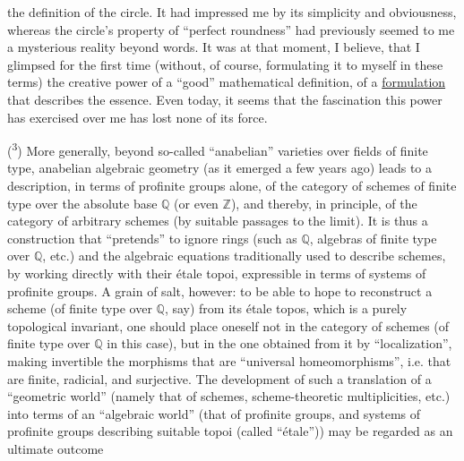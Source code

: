
the definition of the circle. It had impressed me by its
simplicity and obviousness, whereas the circle's property of ``perfect
roundness'' had previously seemed to me a mysterious reality
beyond words. It was at that moment, I believe, that I
glimpsed for the first time (without, of course, formulating it to myself
in these terms) the creative power of a ``good'' mathematical
definition, of a \uline{formulation} that describes the essence. Even today,
it seems that the fascination this power has exercised over
me has lost none of its force.

(\textsuperscript{3}) More generally, beyond so-called ``anabelian'' varieties
over fields of finite type, anabelian algebraic geometry
(as it emerged a few years ago) leads to a
description, in terms of profinite groups alone, of the category
of schemes of finite type over the absolute base $\mathbb{Q}$ (or
even $\mathbb{Z}$), and thereby, in principle, of the category of
arbitrary schemes (by suitable passages to the limit). It
is thus a construction that ``pretends'' to ignore rings
(such as $\mathbb{Q}$, algebras of finite type over $\mathbb{Q}$, etc.) and
the algebraic equations traditionally used to describe
schemes, by working directly with their étale topoi,
expressible in terms of systems of profinite groups. A
grain of salt, however: to be able to hope to reconstruct a
scheme (of finite type over $\mathbb{Q}$, say) from its étale topos,
which is a purely topological invariant, one should place oneself
not in the category of schemes (of finite type over $\mathbb{Q}$ in
this case), but in the one obtained from it by ``localization'',
making invertible the morphisms that are ``universal
homeomorphisms'', i.e. that are finite, radicial, and surjective. The
development of such a translation of a ``geometric world''
(namely that of schemes, scheme-theoretic multiplicities, etc.) into
terms of an ``algebraic world'' (that of profinite groups, and
systems of profinite groups describing suitable topoi (called ``étale''))
may be regarded as an ultimate outcome

